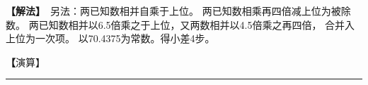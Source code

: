 \documentclass[11pt,a4paper]{article}
\let\origsquare\square
\renewcommand{\square}{\ensuremath{\origsquare}}%
\newcommand{\longline}{\noindent\rule{\textwidth}{0.4pt}}
\newcommand{\mdFAYUE}[1]{%
  \par\noindent\textcolor{methodcolor}{\textbf{【解法】}}\,{\modfont #1}\par\nopagebreak%
}
\newcommand{\mdTSAOYUE}[1]{%
  \par\noindent\textcolor{workcolor}{\textbf【演算】}}\,{\modfont #1}\par%
\begin{document}
\begin{paracol}{2}
\begin{rightcolumn}
\mdFAYUE{%
另法：两已知数相并自乘于上位。
两已知数相乘再四倍减上位为被除数。
两已知数相并以6.5倍乘之于上位，又两数相并以4.5倍乘之再四倍，
合并入上位为一次项。
以70.4375为常数。得小差4步。}

\mdTSAOYUE{%
以两和相约得率一、明率4.5，两数大小差率皆同。
又辨识得明小差、大差皆为半虚黄。
设天元一为小差，以4.5乘之得$\square$为大差，又为明小差，又为半虚黄。
取此大差再以4.5乘之得$\square$为明大差。
四差相并得$\square$，从两和之和中减去得$\square$即两段太虚大小差之和。
内加三段虚黄方$\square$得$\square$，合成一个太虚三事和即圆城径。
自乘得$\square$为径冪（寄左）。
取和加半虚黄得$\square$为平勾。
又取明和内加半虚黄得$\square$为高股，
勾股相乘得下式$\square$，再四倍得$\square$为同数，
与左式相消得下式$\square$。开平方得4步，即小差。符合所问。}
\end{rightcolumn}

\end{paracol}

\vspace{0.3cm}
\begin{center}\longline\end{center}
\end{document}
